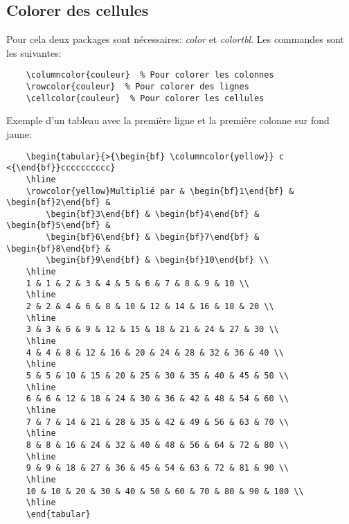 \subsection*{Colorer des cellules}
Pour cela deux packages sont nécessaires: \textit{color} et \textit{colortbl}. Les commandes sont les suivantes:
\begin{verbatim}
    \columncolor{couleur}  % Pour colorer les colonnes
    \rowcolor{couleur}  % Pour colorer des lignes
    \cellcolor{couleur}  % Pour colorer les cellules
\end{verbatim}
\medskip

Exemple d'un tableau avec la première ligne et la première colonne sur fond jaune:
\begin{verbatim}
    \begin{tabular}{>{\begin{bf} \columncolor{yellow}} c <{\end{bf}}cccccccccc}
    \hline  
    \rowcolor{yellow}Multiplié par & \begin{bf}1\end{bf} & \begin{bf}2\end{bf} & 
        \begin{bf}3\end{bf} & \begin{bf}4\end{bf} & \begin{bf}5\end{bf} & 
        \begin{bf}6\end{bf} & \begin{bf}7\end{bf} & \begin{bf}8\end{bf} & 
        \begin{bf}9\end{bf} & \begin{bf}10\end{bf} \\
    \hline 
    1 & 1 & 2 & 3 & 4 & 5 & 6 & 7 & 8 & 9 & 10 \\
    \hline
    2 & 2 & 4 & 6 & 8 & 10 & 12 & 14 & 16 & 18 & 20 \\
    \hline
    3 & 3 & 6 & 9 & 12 & 15 & 18 & 21 & 24 & 27 & 30 \\
    \hline
    4 & 4 & 8 & 12 & 16 & 20 & 24 & 28 & 32 & 36 & 40 \\
    \hline
    5 & 5 & 10 & 15 & 20 & 25 & 30 & 35 & 40 & 45 & 50 \\
    \hline
    6 & 6 & 12 & 18 & 24 & 30 & 36 & 42 & 48 & 54 & 60 \\
    \hline
    7 & 7 & 14 & 21 & 28 & 35 & 42 & 49 & 56 & 63 & 70 \\
    \hline
    8 & 8 & 16 & 24 & 32 & 40 & 48 & 56 & 64 & 72 & 80 \\
    \hline
    9 & 9 & 18 & 27 & 36 & 45 & 54 & 63 & 72 & 81 & 90 \\
    \hline
    10 & 10 & 20 & 30 & 40 & 50 & 60 & 70 & 80 & 90 & 100 \\
    \hline
    \end{tabular}
\end{verbatim}
\medskip


